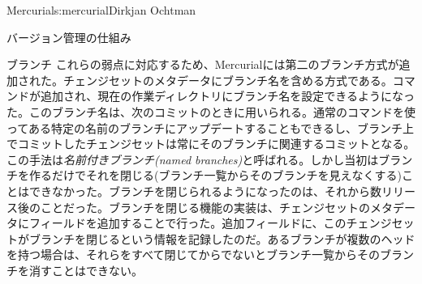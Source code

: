 \begin{aosachapter}{Mercurial}{s:mercurial}{Dirkjan Ochtman}
\begin{aosasect1}{バージョン管理の仕組み}
\begin{aosasect2}{ブランチ}
これらの弱点に対応するため、Mercurialには第二のブランチ方式が追加された。チェンジセットのメタデータにブランチ名を含める方式である。コマンドが追加され、現在の作業ディレクトリにブランチ名を設定できるようになった。このブランチ名は、次のコミットのときに用いられる。通常のコマンドを使ってある特定の名前のブランチにアップデートすることもできるし、ブランチ上でコミットしたチェンジセットは常にそのブランチに関連するコミットとなる。この手法は\emph{名前付きブランチ(named branches)}と呼ばれる。しかし当初はブランチを作るだけでそれを閉じる(ブランチ一覧からそのブランチを見えなくする)ことはできなかった。ブランチを閉じられるようになったのは、それから数リリース後のことだった。ブランチを閉じる機能の実装は、チェンジセットのメタデータにフィールドを追加することで行った。追加フィールドに、このチェンジセットがブランチを閉じるという情報を記録したのだ。あるブランチが複数のヘッドを持つ場合は、それらをすべて閉じてからでないとブランチ一覧からそのブランチを消すことはできない。


\end{aosasect2}
\end{aosasect1}
\end{aosachapter}
